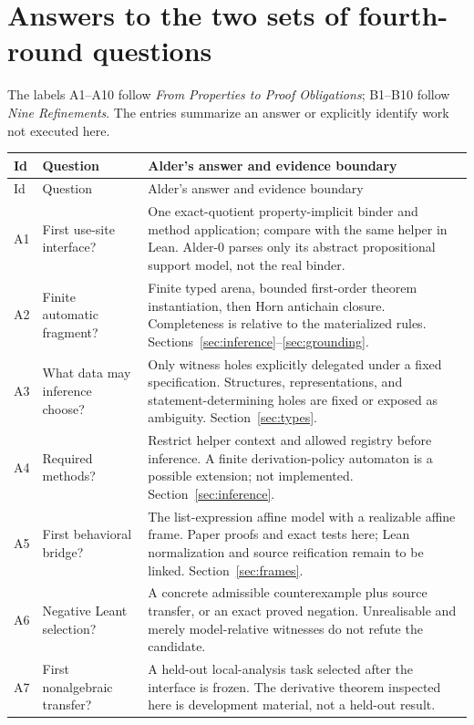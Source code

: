 \documentclass[11pt,a4paper]{article}
\theoremstyle{plain}
\theoremstyle{definition}
\theoremstyle{remark}
\begin{document}
\section{Answers to the two sets of fourth-round questions}\label{app:questions}
The labels A1--A10 follow \emph{From Properties to Proof Obligations}; B1--B10 follow \emph{Nine Refinements}. The entries summarize an answer or explicitly identify work not executed here.
\begingroup\small
\begin{longtable}{@{}P{.08\textwidth}P{.30\textwidth}P{.55\textwidth}@{}}
\toprule Id & Question & Alder's answer and evidence boundary\\\midrule\endfirsthead
\toprule Id & Question & Alder's answer and evidence boundary\\\midrule\endhead
\bottomrule\endfoot
A1 & First use-site interface? & One exact-quotient property-implicit binder and method application; compare with the same helper in Lean. Alder-0 parses only its abstract propositional support model, not the real binder.\\
A2 & Finite automatic fragment? & Finite typed arena, bounded first-order theorem instantiation, then Horn antichain closure. Completeness is relative to the materialized rules. Sections~\ref{sec:inference}--\ref{sec:grounding}.\\
A3 & What data may inference choose? & Only witness holes explicitly delegated under a fixed specification. Structures, representations, and statement-determining holes are fixed or exposed as ambiguity. Section~\ref{sec:types}.\\
A4 & Required methods? & Restrict helper context and allowed registry before inference. A finite derivation-policy automaton is a possible extension; not implemented. Section~\ref{sec:inference}.\\
A5 & First behavioral bridge? & The list-expression affine model with a realizable affine frame. Paper proofs and exact tests here; Lean normalization and source reification remain to be linked. Section~\ref{sec:frames}.\\
A6 & Negative Leant selection? & A concrete admissible counterexample plus source transfer, or an exact proved negation. Unrealisable and merely model-relative witnesses do not refute the candidate.\\
A7 & First nonalgebraic transfer? & A held-out local-analysis task selected after the interface is frozen. The derivative theorem inspected here is development material, not a held-out result.\\

\end{longtable}
\end{document}
